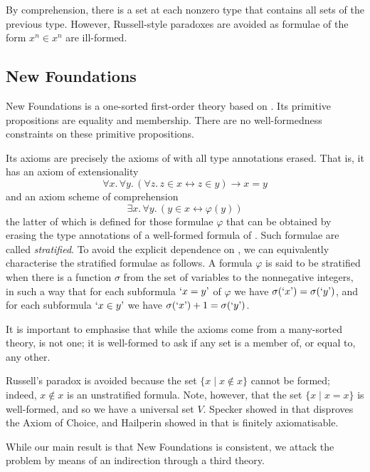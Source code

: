 By comprehension, there is a set at each nonzero type that contains all sets of the previous type.
However, Russell-style paradoxes are avoided as formulae of the form \( x^n \in x^n \) are ill-formed.

\subsection{New Foundations}

New Foundations is a one-sorted first-order theory based on {\TST}.
Its primitive propositions are equality and membership.
There are no well-formedness constraints on these primitive propositions.

Its axioms are precisely the axioms of {\TST} with all type annotations erased.
That is, it has an axiom of extensionality
\[ \forall x.\, \forall y.\, (\forall z.\, z \in x \leftrightarrow z \in y) \to x = y \]
and an axiom scheme of comprehension
\[ \exists x.\, \forall y.\, (y \in x \leftrightarrow \varphi(y)) \]
the latter of which is defined for those formulae \( \varphi \) that can be obtained by erasing the type annotations of a well-formed formula of {\TST}.
Such formulae are called \emph{stratified}.
To avoid the explicit dependence on {\TST}, we can equivalently characterise the stratified formulae as follows.
A formula \( \varphi \) is said to be stratified when there is a function \( \sigma \) from the set of variables to the nonnegative integers, in such a way that for each subformula \( \mquote{x = y} \) of \( \varphi \) we have \( \sigma(\mquote{x}) = \sigma(\mquote{y}) \), and for each subformula \( \mquote{x \in y} \) we have \( \sigma(\mquote{x}) + 1 = \sigma(\mquote{y}) \).

It is important to emphasise that while the axioms come from a many-sorted theory, {\NF} is not one; it is well-formed to ask if any set is a member of, or equal to, any other.

Russell's paradox is avoided because the set \( \{ x \mid x \notin x \} \) cannot be formed; indeed, \( x \notin x \) is an unstratified formula.
Note, however, that the set \( \{ x \mid x = x \} \) is well-formed, and so we have a universal set \( V \).
Specker showed in \cite{specker-choice-nf} that {\NF} disproves the Axiom of Choice, and Hailperin showed in \cite{hailperin-finite-axiomatisation} that {\NF} is finitely axiomatisable.

While our main result is that New Foundations is consistent, we attack the problem by means of an indirection through a third theory.

